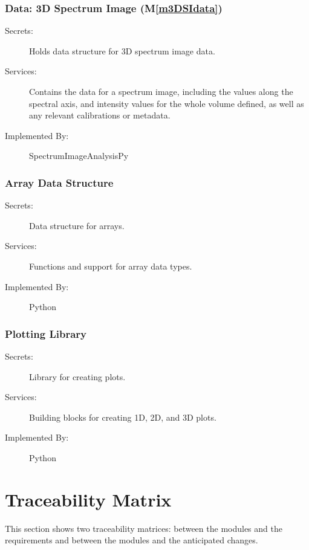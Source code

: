 \documentclass[12pt, titlepage]{article}
\newcommand{\mref}[1]{M\ref{#1}}
\newcommand{\progname}{SpectrumImageAnalysisPy}
\begin{document}
\subsubsection{Data: 3D Spectrum Image (\mref{m3DSIdata})}
\begin{description}
	\item[Secrets:]Holds data structure for 3D spectrum image data.
	\item[Services:]Contains the data for a spectrum image, including the values
along the spectral axis, and intensity values for the whole volume defined, as
well as any relevant calibrations or metadata.
	\item[Implemented By:] \progname
\end{description}

\subsubsection{Array Data Structure}
\begin{description}
	\item[Secrets:]Data structure for arrays.
	\item[Services:]Functions and support for array data types.
	\item[Implemented By:] Python
\end{description}

\subsubsection{Plotting Library}
\begin{description}
	\item[Secrets:]Library for creating plots.
	\item[Services:]Building blocks for creating 1D, 2D, and 3D plots.
	\item[Implemented By:] Python
\end{description}

\section{Traceability Matrix} \label{SecTM}

This section shows two traceability matrices: between the modules and the
requirements and between the modules and the anticipated changes.
\end{document}
